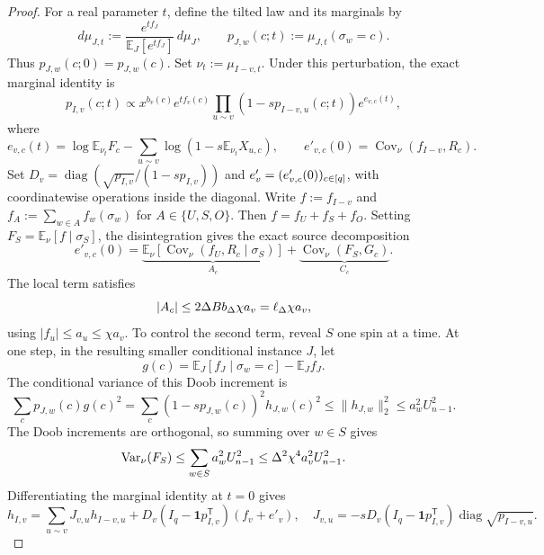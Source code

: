 \begin{proof}
For a real parameter $t$, define the tilted law and its marginals by
\[
 d\mu_{J,t}:=\frac{e^{tf_J}}{\mathbb E_J[e^{tf_J}]}\,d\mu_J,
 \qquad p_{J,w}(c;t):=\mu_{J,t}(\sigma_w=c).
\]
Thus $p_{J,w}(c;0)=p_{J,w}(c)$.  Set $\nu_t:=\mu_{I-v,t}$.
Under this perturbation, the exact marginal identity is
\[
 p_{I,v}(c;t)\propto x^{b_v(c)}e^{tf_v(c)}
 \prod_{u\sim v}(1-sp_{I-v,u}(c;t))e^{e_{v,c}(t)},
\]
where
\[
 e_{v,c}(t)=\log\mathbb E_{\nu_t}F_c
 -\sum_{u\sim v}\log(1-s\mathbb E_{\nu_t}X_{u,c}),
 \qquad e'_{v,c}(0)=\operatorname{Cov}_\nu(f_{I-v},R_c).
\]
Set $D_v=\operatorname{diag}(\sqrt{p_{I,v}}/(1-sp_{I,v}))$ and
$e'_v=(e'_{v,c}(0))_{c\in[q]}$, with coordinatewise operations
inside the diagonal.  Write $f:=f_{I-v}$ and
$f_A:=\sum_{w\in A}f_w(\sigma_w)$ for $A\in\{U,S,O\}$.
Then $f=f_U+f_S+f_O$.  Setting
$F_S=\mathbb E_\nu[f\mid\sigma_S]$, the disintegration gives the exact
source decomposition
\begin{equation}\label{eq:girth5-source-decomposition}
 e'_{v,c}(0)=
 \underbrace{\mathbb E_\nu[\operatorname{Cov}_\nu(f_U,R_c\mid\sigma_S)]}_{A_c}
 +\underbrace{\operatorname{Cov}_\nu(F_S,G_c)}_{C_c}.
\end{equation}
The local term satisfies
\begin{equation}\label{eq:girth5-local-source}
 |A_c|\le 2\Delta B b_\Delta\chi a_v
 =\ell_\Delta\chi a_v,
\end{equation}
using $|f_u|\le a_u\le\chi a_v$.  To control the second term, reveal
$S$ one spin at a time.  At one step, in the resulting smaller conditional
instance $J$, let
\[
 g(c)=\mathbb E_J[f_J\mid\sigma_w=c]-\mathbb E_J f_J.
\]
The conditional variance of this Doob increment is
\begin{equation}\label{eq:girth5-doob-increment}
 \sum_c p_{J,w}(c)g(c)^2
 =\sum_c(1-sp_{J,w}(c))^2h_{J,w}(c)^2
 \le\|h_{J,w}\|_2^2
 \le a_w^2U_{n-1}^2.
\end{equation}
The Doob increments are orthogonal, so summing over $w\in S$ gives
\begin{equation}\label{eq:girth5-revealed-variance}
 \operatorname{Var}_\nu(F_S)
 \le\sum_{w\in S}a_w^2U_{n-1}^2
 \le\Delta^2\chi^4a_v^2U_{n-1}^2.
\end{equation}
Differentiating the marginal identity at $t=0$ gives
\begin{equation}\label{eq:girth5-response-recursion}
 h_{I,v}=\sum_{u\sim v}J_{v,u}h_{I-v,u}
 +D_v(I_q-\mathbf1p_{I,v}^{\mathsf T})(f_v+e'_v),\quad
 J_{v,u}=-sD_v(I_q-\mathbf1p_{I,v}^{\mathsf T})
 \operatorname{diag}\sqrt{p_{I-v,u}}.
\end{equation}

\end{proof}
